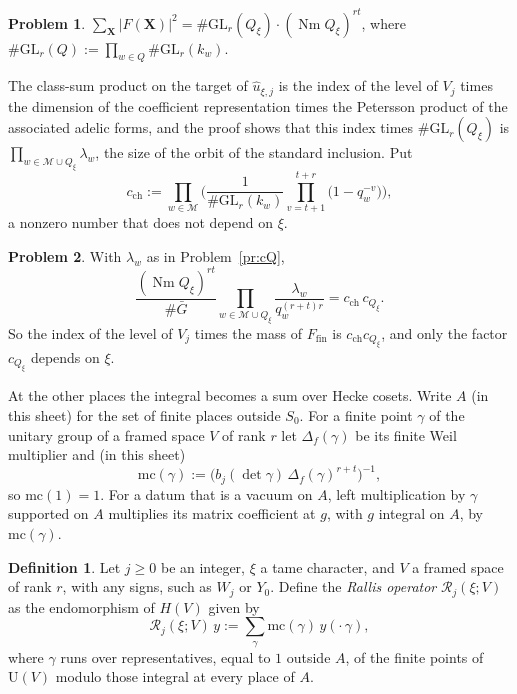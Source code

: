 \documentclass[reqno]{amsart}
\theoremstyle{definition}
\newtheorem{problem}{Problem}[section]
\newtheorem{definition}{Definition}[section]
\theoremstyle{plain}
\newcommand{\Mch}{\mathcal{M}}
\newcommand{\Rc}{\mathcal{R}}
\newcommand{\Nm}{\operatorname{Nm}}
\newcommand{\GL}{\mathrm{GL}}
\newcommand{\U}{\mathrm{U}}
\newcommand{\cch}{c_{\mathrm{ch}}}
\newcommand{\uh}{\hat u}
\begin{document}
\begin{problem}\label{pr:sum-block}
\(\sum_{\mathbf X} \lvert F(\mathbf X)\rvert^2 = \#\GL_r(Q_\xi) \cdot (\Nm Q_\xi)^{rt}\), where \(\#\GL_r(Q) := \prod_{w \in Q} \#\GL_r(k_w)\).
\end{problem}

The class-sum product on the target of \(\uh_{\xi,j}\) is the index of the level of \(V_j\) times the dimension of the coefficient representation times the Petersson product of the associated adelic forms, and the proof shows that this index times \(\#\GL_r(Q_\xi)\) is \(\prod_{w \in \Mch \cup Q_\xi} \lambda_w\), the size of the orbit of the standard inclusion.  Put
\[
  \cch := \prod_{w \in \Mch} \biggl( \frac{1}{\#\GL_r(k_w)} \prod_{v = t+1}^{t+r} \bigl(1 - q_w^{-v}\bigr) \biggr) ,
\]
a nonzero number that does not depend on \(\xi\).

\begin{problem}\label{pr:mass}
With \(\lambda_w\) as in Problem~\ref{pr:cQ},
\[
  \frac{(\Nm Q_\xi)^{rt}}{\#\bar G} \prod_{w \in \Mch \cup Q_\xi} \frac{\lambda_w}{q_w^{(r+t)r}} = \cch\, c_{Q_\xi} .
\]
So the index of the level of \(V_j\) times the mass of \(F_{\mathrm{fin}}\) is \(\cch c_{Q_\xi}\), and only the factor \(c_{Q_\xi}\) depends on \(\xi\).
\end{problem}

At the other places the integral becomes a sum over Hecke cosets.  Write \(A\) (in this sheet) for the set of finite places outside \(S_0\).  For a finite point \(\gamma\) of the unitary group of a framed space \(V\) of rank \(r\) let \(\Delta_f(\gamma)\) be its finite Weil multiplier and (in this sheet)
\[
  \mathrm{mc}(\gamma) := \bigl(b_j(\det\gamma)\, \Delta_f(\gamma)^{r+t}\bigr)^{-1} ,
\]
so \(\mathrm{mc}(1) = 1\).  For a datum that is a vacuum on \(A\), left multiplication by \(\gamma\) supported on \(A\) multiplies its matrix coefficient at \(g\), with \(g\) integral on \(A\), by \(\mathrm{mc}(\gamma)\).

\begin{definition}\label{def:rallis-operator}
Let \(j \ge 0\) be an integer, \(\xi\) a tame character, and \(V\) a framed space of rank \(r\), with any signs, such as \(W_j\) or \(Y_0\).  Define the \emph{Rallis operator} \(\Rc_j(\xi; V)\) as the endomorphism of \(H(V)\) given by
\[
  \Rc_j(\xi; V)\, y := \sum_\gamma \mathrm{mc}(\gamma)\, y(\cdot\, \gamma) ,
\]
where \(\gamma\) runs over representatives, equal to \(1\) outside \(A\), of the finite points of \(\U(V)\) modulo those integral at every place of \(A\).
\end{definition}
\end{document}
